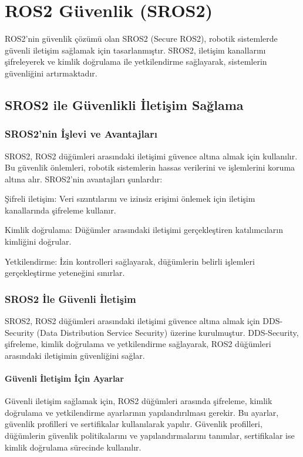 \chapter{ROS2 Güvenlik (SROS2)}

ROS2'nin güvenlik çözümü olan SROS2 (Secure ROS2), robotik sistemlerde güvenli iletişim sağlamak için tasarlanmıştır. SROS2, iletişim kanallarını şifreleyerek ve kimlik doğrulama ile yetkilendirme sağlayarak, sistemlerin güvenliğini artırmaktadır.

\section{SROS2 ile Güvenlikli İletişim Sağlama}
\subsection{SROS2'nin İşlevi ve Avantajları}
SROS2, ROS2 düğümleri arasındaki iletişimi güvence altına almak için kullanılır. Bu güvenlik önlemleri, robotik sistemlerin hassas verilerini ve işlemlerini koruma altına alır. SROS2'nin avantajları şunlardır:

Şifreli iletişim: Veri sızıntılarını ve izinsiz erişimi önlemek için iletişim kanallarında şifreleme kullanır.

Kimlik doğrulama: Düğümler arasındaki iletişimi gerçekleştiren katılımcıların kimliğini doğrular.

Yetkilendirme: İzin kontrolleri sağlayarak, düğümlerin belirli işlemleri gerçekleştirme yeteneğini sınırlar.
\subsection{SROS2 İle Güvenli İletişim}
SROS2, ROS2 düğümleri arasındaki iletişimi güvence altına almak için DDS-Security (Data Distribution Service Security) üzerine kurulmuştur. DDS-Security, şifreleme, kimlik doğrulama ve yetkilendirme sağlayarak, ROS2 düğümleri arasındaki iletişimin güvenliğini sağlar.

\subsubsection{Güvenli İletişim İçin Ayarlar}
Güvenli iletişim sağlamak için, ROS2 düğümleri arasında şifreleme, kimlik doğrulama ve yetkilendirme ayarlarının yapılandırılması gerekir. Bu ayarlar, güvenlik profilleri ve sertifikalar kullanılarak yapılır. Güvenlik profilleri, düğümlerin güvenlik politikalarını ve yapılandırmalarını tanımlar, sertifikalar ise kimlik doğrulama sürecinde kullanılır.
